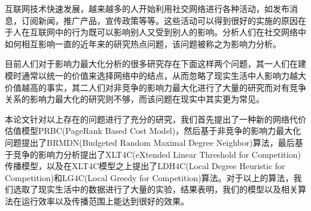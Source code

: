 
 

\makeatletter
\ifthu@bachelor\relax\else
  \ifthu@doctor
  \else
    \ifthu@master
    \fi
  \fi
\fi
\makeatother






\begin{cabstract}
互联网技术快速发展，越来越多的人开始利用社交网络进行各种活动，如发布消息，订阅新闻，推广产品，宣传政策等等。这些活动可以得到很好的实施的原因在于人在互联网中的行为既可以影响别人又受到别人的影响。分析人们在社交网络中如何相互影响一直的近年来的研究热点问题，该问题被称之为影响力分析。

目前人们对于影响力最大化分析的很多研究存在下面这样两个问题，其一人们在建模时通常以统一的价值来选择网络中的结点，从而忽略了现实生活中人影响力越大价值越高的事实，其二人们对非竞争的影响力最大化进行了大量的研究而对有竞争关系的影响力最大化的研究则不够，而该问题在现实中其实更为常见。

本论文针对以上存在的问题进行了充分的研究，我们首先提出了一种新的网络代价估值模型PRBC(PageRank Based Cost Model)，然后基于非竞争的影响力最大化问题提出了BRMDN(Budgeted Random Maximal Degree Neighbor)算法，最后基于竞争的影响力分析提出了XLT4C(eXtended Linear Threshold for Competition)传播模型，以及在XLT4C模型之上提出了LDH4C(Local Degree Heuristic for Competition)和LG4C(Local Greedy for Competition)算法。对于以上的算法，我们选取了现实生活中的数据进行了大量的实验，结果表明，我们的模型以及相关算法在运行效率以及传播范围上能达到很好的效果。

\end{cabstract}

